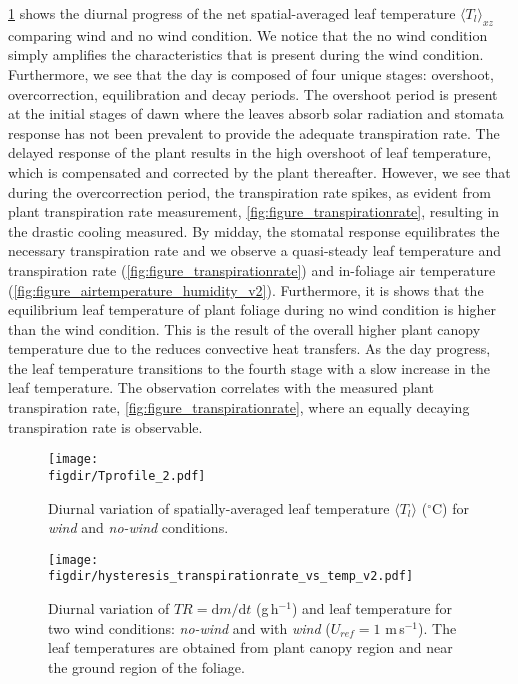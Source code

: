 \cref{fig:Tprofile_2} shows the diurnal progress of the net spatial-averaged leaf temperature $\langle T_l \rangle_{xz}$ comparing wind and no wind condition. We notice that the no wind condition simply amplifies the characteristics that is present during the wind condition. Furthermore, we see that the day is composed of four unique stages: overshoot, overcorrection, equilibration and decay periods. The overshoot period is present at the initial stages of dawn where the leaves absorb solar radiation and stomata response has not been prevalent to provide the adequate transpiration rate. The delayed response of the plant results in the high overshoot of leaf temperature, which is compensated and corrected by the plant thereafter. However, we see that during the overcorrection period, the transpiration rate spikes, as evident from plant transpiration rate measurement, \cref{fig:figure_transpirationrate}, resulting in the drastic cooling measured. By midday, the stomatal response equilibrates the necessary transpiration rate and we observe a quasi-steady leaf temperature and transpiration rate (\cref{fig:figure_transpirationrate}) and in-foliage air temperature (\cref{fig:figure_airtemperature_humidity_v2}). Furthermore, it is shows that the equilibrium leaf temperature of plant foliage during no wind condition is higher than the wind condition. This is the result of the overall higher plant canopy temperature due to the reduces convective heat transfers. As the day progress, the leaf temperature transitions to the fourth stage with a slow increase in the leaf temperature. The observation correlates with the measured plant transpiration rate, \cref{fig:figure_transpirationrate}, where an equally decaying transpiration rate is observable. 

	\begin{figure}[t]
	\centering
	\texttt{[image: \\figdir/Tprofile\_2.pdf]}
	\caption{Diurnal variation of spatially-averaged leaf temperature $\langle T_l \rangle$ ($^{\circ}$C) for \textit{wind} and \textit{no-wind} conditions.}
	\label{fig:Tprofile_2}
	\end{figure}

	\begin{figure}[t]
	\centering
	\texttt{[image: \\figdir/hysteresis\_transpirationrate\_vs\_temp\_v2.pdf]}
	\caption{Diurnal variation of $TR=\mathrm{d}m/\mathrm{d}t$ (g\,h$^{-1}$) and leaf temperature for two wind conditions:   \textit{no-wind} and   with \textit{wind} ($U_{ref}=1$ m\,s$^{-1}$). The leaf temperatures are obtained from  plant canopy region and   near the ground region of the foliage.}
	\label{fig:hysteresis_transpirationrate_vs_temp_v2}
	\end{figure}

